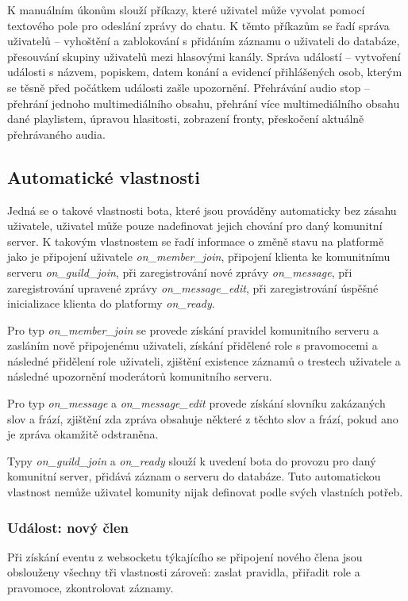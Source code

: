\documentclass[
  program=inf,
biblatex=false,
sourcecodes=true,
joinlists=true,
  figures=true,
  tables=true,
  glossaries=true,
  index=false
]{kidiplom}
\begin{document}
K manuálním úkonům slouží příkazy, které uživatel může vyvolat pomocí textového pole
pro odeslání zprávy do chatu. K těmto příkazům se řadí správa uživatelů -- vyhoštění a
zablokování s přidáním záznamu o uživateli do databáze, přesouvání skupiny uživatelů
mezi hlasovými kanály. Správa událostí -- vytvoření události s názvem, popiskem, datem konání
a evidencí přihlášených osob, kterým se těsně před počátkem události zašle upozornění. 
Přehrávání audio stop --
přehrání jednoho multimediálního obsahu, přehrání více multimediálního obsahu dané playlistem, úpravou hlasitosti, zobrazení
fronty, přeskočení aktuálně přehrávaného audia.

\subsection{Automatické vlastnosti}
Jedná se o takové vlastnosti bota, které jsou prováděny automaticky bez zásahu uživatele, uživatel
může pouze nadefinovat jejich chování pro daný komunitní server. K takovým vlastnostem
se řadí informace o změně stavu na platformě jako je připojení uživatele {\it on\_member\_join}, připojení
klienta ke komunitnímu serveru {\it on\_guild\_join}, při zaregistrování nové zprávy {\it on\_message}, při zaregistrování
upravené zprávy {\it on\_message\_edit}, při zaregistrování úspěšné inicializace klienta do platformy {\it on\_ready}.


Pro typ {\it on\_member\_join} se provede získání pravidel komunitního serveru a zasláním
nově připojenému uživateli, získání přidělené role s pravomocemi a následné přidělení role uživateli,
zjištění existence záznamů o trestech uživatele a následné upozornění moderátorů komunitního serveru.

Pro typ {\it on\_message} a {\it on\_message\_edit} provede získání slovníku zakázaných slov a frází, 
zjištění zda zpráva obsahuje některé z těchto slov a frází, pokud ano je zpráva okamžitě odstraněna.

Typy {\it on\_guild\_join} a {\it on\_ready} slouží k uvedení bota do provozu pro daný komunitní server, přidává
záznam o serveru do databáze. Tuto automatickou vlastnost nemůže uživatel komunity nijak definovat podle
svých vlastních potřeb.

\subsubsection{Událost: nový člen}
Při získání eventu z websocketu týkajícího se připojení nového člena jsou obslouženy 
všechny tři vlastnosti zároveň: zaslat pravidla, přiřadit role a pravomoce, zkontrolovat záznamy.
\end{document}
